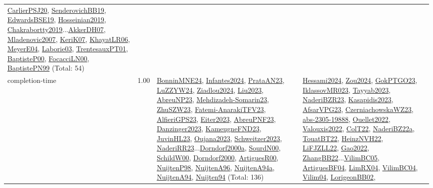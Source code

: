 {\begin{longtable}{p{3cm}r>{\raggedright\arraybackslash}p{6cm}>{\raggedright\arraybackslash}p{6cm}>{\raggedright\arraybackslash}p{8cm}}
\hyperref[detail:CarlierPSJ20]{CarlierPSJ20}, \hyperref[detail:SenderovichBB19]{SenderovichBB19}, \hyperref[detail:EdwardsBSE19]{EdwardsBSE19}, \hyperref[detail:Hosseinian2019]{Hosseinian2019}, \hyperref[detail:Chakrabortty2019]{Chakrabortty2019}...\hyperref[detail:AkkerDH07]{AkkerDH07}, \hyperref[detail:Mladenovic2007]{Mladenovic2007}, \hyperref[detail:KeriK07]{KeriK07}, \hyperref[detail:KhayatLR06]{KhayatLR06}, \hyperref[detail:MeyerE04]{MeyerE04}, \hyperref[detail:Laborie03]{Laborie03}, \hyperref[detail:TrentesauxPT01]{TrentesauxPT01}, \hyperref[detail:BaptisteP00]{BaptisteP00}, \hyperref[detail:FocacciLN00]{FocacciLN00}, \hyperref[detail:BaptistePN99]{BaptistePN99} (Total: 54)\\
\index{completion-time}\index{Concepts!completion-time}completion-time &  1.00 & \hyperref[detail:BonninMNE24]{BonninMNE24}, \hyperref[detail:Infantes2024]{Infantes2024}, \hyperref[detail:PrataAN23]{PrataAN23}, \hyperref[detail:LuZZYW24]{LuZZYW24}, \hyperref[detail:Ziadlou2024]{Ziadlou2024}, \hyperref[detail:Liu2023]{Liu2023}, \hyperref[detail:AbreuNP23]{AbreuNP23}, \hyperref[detail:Mehdizadeh-Somarin23]{Mehdizadeh-Somarin23}, \hyperref[detail:ZhuSZW23]{ZhuSZW23}, \hyperref[detail:Fatemi-AnarakiTFV23]{Fatemi-AnarakiTFV23}, \hyperref[detail:AlfieriGPS23]{AlfieriGPS23}, \hyperref[detail:Eiter2023]{Eiter2023}, \hyperref[detail:AbreuPNF23]{AbreuPNF23}, \hyperref[detail:Danzinger2023]{Danzinger2023}, \hyperref[detail:KameugneFND23]{KameugneFND23}, \hyperref[detail:JuvinHL23]{JuvinHL23}, \hyperref[detail:Oujana2023]{Oujana2023}, \hyperref[detail:Schweitzer2023]{Schweitzer2023}, \hyperref[detail:NaderiRR23]{NaderiRR23}...\hyperref[detail:Dorndorf2000a]{Dorndorf2000a}, \hyperref[detail:SourdN00]{SourdN00}, \hyperref[detail:SchildW00]{SchildW00}, \hyperref[detail:Dorndorf2000]{Dorndorf2000}, \hyperref[detail:ArtiguesR00]{ArtiguesR00}, \hyperref[detail:NuijtenP98]{NuijtenP98}, \hyperref[detail:NuijtenA96]{NuijtenA96}, \hyperref[detail:NuijtenA94a]{NuijtenA94a}, \hyperref[detail:NuijtenA94]{NuijtenA94}, \hyperref[detail:Nuijten94]{Nuijten94} (Total: 136) & \hyperref[detail:Hessami2024]{Hessami2024}, \hyperref[detail:Zou2024]{Zou2024}, \hyperref[detail:GokPTGO23]{GokPTGO23}, \hyperref[detail:IklassovMR023]{IklassovMR023}, \hyperref[detail:Tayyab2023]{Tayyab2023}, \hyperref[detail:NaderiBZR23]{NaderiBZR23}, \hyperref[detail:Kasapidis2023]{Kasapidis2023}, \hyperref[detail:AfsarVPG23]{AfsarVPG23}, \hyperref[detail:CzerniachowskaWZ23]{CzerniachowskaWZ23}, \hyperref[detail:abs-2305-19888]{abs-2305-19888}, \hyperref[detail:Ouellet2022]{Ouellet2022}, \hyperref[detail:Valouxis2022]{Valouxis2022}, \hyperref[detail:ColT22]{ColT22}, \hyperref[detail:NaderiBZ22a]{NaderiBZ22a}, \hyperref[detail:TouatBT22]{TouatBT22}, \hyperref[detail:HeinzNVH22]{HeinzNVH22}, \hyperref[detail:LiFJZLL22]{LiFJZLL22}, \hyperref[detail:Gao2022]{Gao2022}, \hyperref[detail:ZhangBB22]{ZhangBB22}...\hyperref[detail:VilimBC05]{VilimBC05}, \hyperref[detail:ArtiguesBF04]{ArtiguesBF04}, \hyperref[detail:LimRX04]{LimRX04}, \hyperref[detail:VilimBC04]{VilimBC04}, \hyperref[detail:Vilim04]{Vilim04}, \hyperref[detail:LorigeonBB02]{LorigeonBB02}, 
\end{longtable}}
